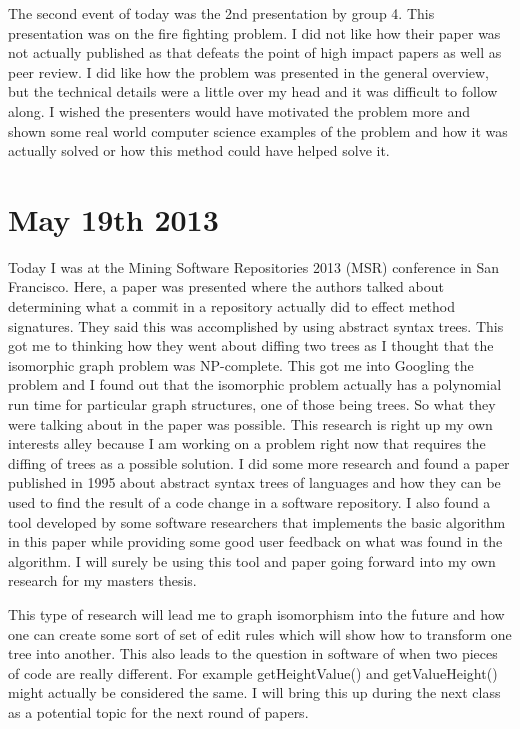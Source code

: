 \documentclass[conference]{IEEEtran}
\begin{document}
The second event of today was the 2nd presentation by group 4. This
presentation was on the fire fighting problem. I did not like how their 
paper was not actually published as that defeats the point of high impact
papers as well as peer review. I did like how the problem was presented
in the general overview, but the technical details were a little over 
my head and it was difficult to follow along. I wished the presenters
would have motivated the problem more and shown some real world
computer science examples of the problem and how it was actually
solved or how this method could have helped solve it.

\section{May 19th 2013}
Today I was at the Mining Software Repositories 2013 (MSR) conference in
San Francisco. Here, a paper was presented where the authors talked about
determining what a commit in a repository actually did to effect method
signatures. They said this was accomplished by using abstract syntax trees.
This got me to thinking how they went about diffing two trees as I 
thought that the isomorphic graph problem was NP-complete. This got me
into Googling the problem and I found out that the isomorphic problem actually
has a polynomial run time for particular graph structures, one of those 
being trees. So what they were talking about in the paper was possible.
This research is right up my own interests alley because I am working on
a problem right now that requires the diffing of trees as a possible
solution. I did some more research and found a paper published in 1995 
about abstract syntax trees of languages and how they can be used to find
the result of a code change in a software repository. I also found a 
tool developed by some software researchers that implements the basic
algorithm in this paper while providing some good user feedback on what
was found in the algorithm. I will surely be using this tool and paper
going forward into my own research for my masters thesis.

This type of research will lead me to graph isomorphism into the future
and how one can create some sort of set of edit rules which will show
how to transform one tree into another. This also leads to the question
in software of when two pieces of code are really different. For example
getHeightValue() and getValueHeight() might actually be considered the 
same. I will bring this up during the next class as a potential topic
for the next round of papers.
\end{document}
